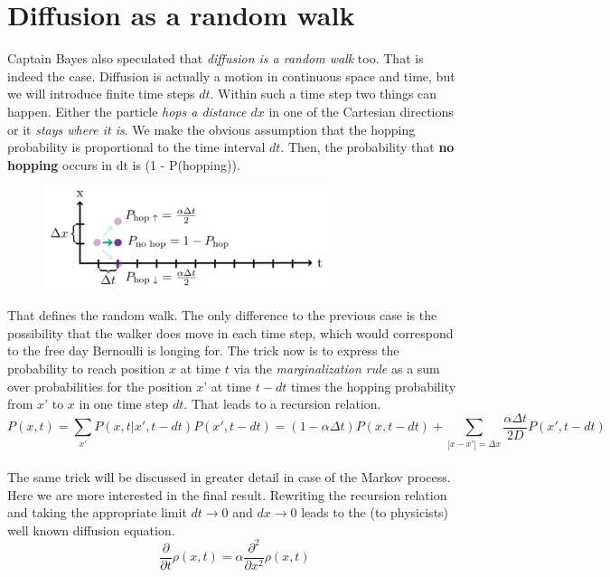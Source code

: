 \documentclass[12pt, a4paper]{scrartcl}
\begin{document}
\section*{Diffusion as a random walk}
Captain Bayes also speculated that \textit{diffusion is a random walk} too. That is indeed the case.
Diffusion is actually a motion in continuous space and time, but we will introduce finite time steps $dt$. Within such a time step two things can happen. Either the particle \textit{hops a distance $dx$} in one of the Cartesian directions or it \textit{stays where it is}. We make the obvious assumption that the hopping probability is proportional to the time interval $dt$.
Then, the probability that \textbf{no hopping} occurs in dt is (1 - P(hopping)). %
 \begin{figure}[H]
	\centering
	\includegraphics[width=0.75\textwidth]{5_3.png}
\end{figure}
That defines the random walk. The only difference to the previous case is the possibility that the walker does  move in each time step, which would correspond to the free day Bernoulli is longing for.
The trick now is to express the probability to reach position $x$ at time $t$ via the \textit{marginalization rule} as a sum over probabilities for the position $x’$ at time $t-dt$ times the hopping probability from $x’$ to $x$ in one time step $dt$. That leads to a recursion relation. 
\begin{equation*}\boxed{P(x,t)=\sum_{x'}P(x,t|x',t-dt)P(x',t-dt)=(1-\alpha\Delta t)P(x,t-dt)+\sum_{|x-x'|=\Delta x}\frac{\alpha\Delta t}{2D}P(x',t-dt)
}\end{equation*}\\
The same trick will be discussed in greater detail in case of the Markov process. Here we are more interested in the final result.
Rewriting the recursion relation and taking the appropriate limit $dt\rightarrow 0$ and $dx \rightarrow 0$ leads to the (to physicists) well known diffusion equation.
\begin{equation*}\boxed{\frac{\partial}{\partial t}\rho(x,t)=\alpha \frac{\partial^2}{\partial x^2}\rho(x,t)
}\end{equation*}\\
\end{document}
